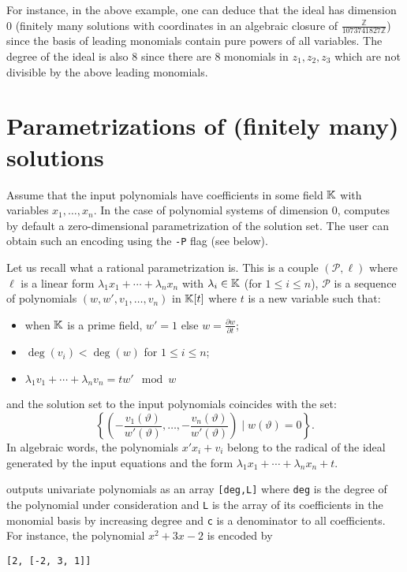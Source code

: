 \documentclass[a4paper,english,11pt]{scrartcl}
\theoremstyle{definition}
\theoremstyle{remark}
\def\leq{\leqslant}
\begin{document}
For instance, in the above example, one can deduce that the ideal has dimension
$0$ (finitely many solutions with coordinates in an algebraic closure of
$\frac{\mathbb{Z}}{1073741827\mathbb{Z}}$) since the basis of leading monomials
contain pure powers of all variables. The degree of the ideal is also $8$ since
there are $8$ monomials in $z_1, z_2, z_3$ which are not divisible by the above
leading monomials.

\section{Parametrizations of (finitely many) solutions}\label{sec:param}

Assume that the input polynomials have coefficients in some field $\mathbb{K}$ with
variables $x_1, \ldots, x_n$. In the case of polynomial systems of dimension
$0$, \msolve computes by default a zero-dimensional parametrization of the
solution set. The user can obtain such an encoding using the \verb+-P+ flag 
(see below).

Let us recall what a rational parametrization is.
This is a couple $(\mathscr{P}, \ell)$ where $\ell$ is a linear form $\lambda_1
x_1 + \cdots + \lambda_n x_n$ with $\lambda_i\in \mathbb{K}$ (for $1\leq i \leq n$),
$\mathscr{P}$ is a sequence of polynomials $(w, w', v_1, \ldots, v_n)$ in
$\mathbb{K}[t]$ where $t$ is a new variable such that:
\begin{itemize}
\item when $\mathbb{K}$ is a prime field, $w'=1$ else $w = \frac{\partial w}{\partial
    t}$;
\item $\deg(v_i) < \deg(w)$ for $1\leq i \leq n$;
\item $\lambda_1 v_1 +\cdots +\lambda_n v_n = tw' \mod w$
\end{itemize}
and the solution set to the input polynomials coincides with the set:
\[
\left \{\left (-\frac{v_1(\vartheta)}{w'(\vartheta)}, \ldots,
  -\frac{v_n(\vartheta)}{w'(\vartheta)}\right ) \mid w(\vartheta) = 0
\right\}.
\]
In algebraic words, the polynomials \(x' x_i + v_i\) belong to the radical of the 
ideal generated by the input equations and the form \(\lambda_1 x_1 + \cdots +
\lambda_n x_n + t\). 

\msolve outputs univariate polynomials as an array \verb+[deg,L]+ where
\verb+deg+ is the degree of the polynomial under consideration and \verb+L+ is
the array of its coefficients in the monomial basis by increasing degree and 
\verb+c+ is a denominator to all coefficients. For instance, the polynomial 
\(x^2+3x-2\) is encoded by 
\begin{verbatim}
[2, [-2, 3, 1]]
\end{verbatim}
\end{document}
